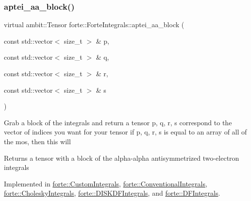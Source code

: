 \mbox{\label{classforte_1_1_forte_integrals_ac20ae649b8cfe116f8583d676e43da27}} 
\subsubsection{\texorpdfstring{aptei\+\_\+aa\+\_\+block()}{aptei\_aa\_block()}}
{\footnotesize\ttfamily virtual ambit\+::\+Tensor forte\+::\+Forte\+Integrals\+::aptei\+\_\+aa\+\_\+block (\begin{DoxyParamCaption}\item[{const std\+::vector$<$ size\+\_\+t $>$ \&}]{p,  }\item[{const std\+::vector$<$ size\+\_\+t $>$ \&}]{q,  }\item[{const std\+::vector$<$ size\+\_\+t $>$ \&}]{r,  }\item[{const std\+::vector$<$ size\+\_\+t $>$ \&}]{s }\end{DoxyParamCaption})\hspace{0.3cm}{\ttfamily [pure virtual]}}

Grab a block of the integrals and return a tensor p, q, r, s correspond to the vector of indices you want for your tensor if p, q, r, s is equal to an array of all of the mos, then this will \begin{DoxyReturn}{Returns}
a tensor with a block of the alpha-\/alpha antisymmetrized two-\/electron integrals 
\end{DoxyReturn}


Implemented in \mbox{\hyperlink{classforte_1_1_custom_integrals_ae60addb837588a5101f1f2485a818426}{forte\+::\+Custom\+Integrals}}, \mbox{\hyperlink{classforte_1_1_conventional_integrals_abbe1dfb244b776a9d50fb2a06a837cbf}{forte\+::\+Conventional\+Integrals}}, \mbox{\hyperlink{classforte_1_1_cholesky_integrals_aeaecb1b7275f8b9fc8b87b4a3b110fcd}{forte\+::\+Cholesky\+Integrals}}, \mbox{\hyperlink{classforte_1_1_d_i_s_k_d_f_integrals_a2709b0116f0e44fc1eb8038a2b7afd54}{forte\+::\+D\+I\+S\+K\+D\+F\+Integrals}}, and \mbox{\hyperlink{classforte_1_1_d_f_integrals_a2dc1ace8715b3c5a9b7c9da4afbeee44}{forte\+::\+D\+F\+Integrals}}.

\mbox{\label{classforte_1_1_forte_integrals_a45efc2329cdfc7e4690cbe85688b947e}} 
